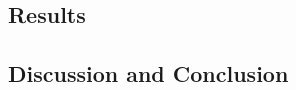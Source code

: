             
        \subsection{Results} \label{sec:feasibility_of_neural_network_based_data_driven_surrogate_signal_extraction_methods_for_dynamic_pet_results}
            
            
        \subsection{Discussion and Conclusion} \label{sec:feasibility_of_neural_network_based_data_driven_surrogate_signal_extraction_methods_for_dynamic_pet_discussion_and_conclusion}
            
